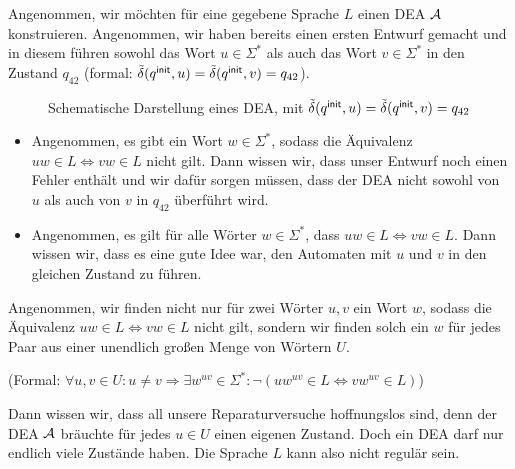 Angenommen, wir möchten für eine gegebene Sprache $L$ einen \ac{DEA} $\mathcal{A}$ konstruieren.
Angenommen, wir haben bereits einen ersten Entwurf gemacht und in diesem führen sowohl das Wort $u\in\Sigma^*$
als auch das Wort $v\in\Sigma^*$ in den Zustand $q_{42}$ (formal: $\tilde\delta(q^\mathsf{init}, u) = \tilde\delta(q^\mathsf{init}, v) = q_{42}$).
\begin{figure}[H]\centering
	\caption{Schematische Darstellung eines \ac{DEA}, mit $\tilde\delta(q^\mathsf{init}, u) = \tilde\delta(q^\mathsf{init}, v) = q_{42}$}
\end{figure}
\begin{itemize}
 \item Angenommen, es gibt ein Wort $w\in\Sigma^*$, sodass die Äquivalenz $uw\in L \Leftrightarrow vw\in L$ nicht gilt.
 Dann wissen wir, dass unser Entwurf noch einen Fehler enthält und wir dafür sorgen müssen, 
 dass der \ac{DEA} nicht sowohl von $u$
 als auch von $v$ in $q_{42}$ überführt wird.
 \item Angenommen, es gilt für alle Wörter $w\in\Sigma^*$, dass $uw\in L\Leftrightarrow vw\in L$.
 Dann wissen wir, dass es eine gute Idee war, den Automaten mit $u$ und $v$ in den gleichen Zustand zu führen.
\end{itemize}
Angenommen, wir finden nicht nur für zwei Wörter $u,v$ ein Wort $w$, sodass die Äquivalenz $uw\in L \Leftrightarrow vw\in L$ nicht gilt,
sondern wir finden solch ein $w$ für jedes Paar aus einer unendlich großen Menge von Wörtern $U$.
\begin{center}
(Formal: $\forall u,v\in U: u\neq v \Rightarrow \exists w^{uv}\in\Sigma^*: \neg(uw^{uv}\in L \Leftrightarrow vw^{uv}\in L)$) 
\end{center}
Dann wissen wir, dass all unsere Reparaturversuche hoffnungslos sind,
denn der \ac{DEA} $\mathcal{A}$ bräuchte für jedes $u\in U$ einen eigenen Zustand.
Doch ein \ac{DEA} darf nur endlich viele Zustände haben.
Die Sprache $L$ kann also nicht regulär sein.

